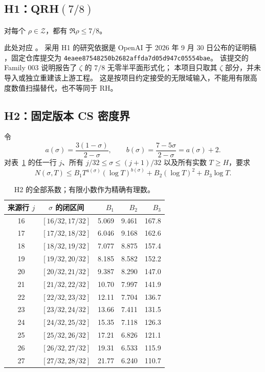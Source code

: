\subsection{H1：QRH$(7/8)$}

\begin{definition}[H1：八分之七零点界]
\label{hyp:qrh}
对每个 $\rho\in\mathcal Z$，都有 $\Re\rho\le7/8$。
\end{definition}
此处对应 。
采用 H1 的研究依据是 OpenAI 于 2026 年 9 月 30 日公布的证明稿
\cite{OpenAIQRH}，固定仓库提交为
\nolinkurl{4eaee87548250b2682affda7d05d947c05554bae}。
该提交的 Family 003 说明报告了 $\zeta$ 的 $7/8$ 无零半平面形式化；
本项目只取其 $\zeta$ 部分，并未导入或独立重建该上游工程。
这是按项目约定接受的无限域输入，不能用有限高度数值扫描替代，也不等同于 RH。

\subsection{H2：固定版本 CS 密度界}

\begin{definition}[H2：CS v2 的指定十二行]
\label{hyp:cs}
令
\[
a(\sigma)=\frac{3(1-\sigma)}{2-\sigma},\qquad
b(\sigma)=\frac{7-5\sigma}{2-\sigma}=a(\sigma)+2.
\]
对表~\ref{tab:cs-input} 的任一行 $j$、所有
$j/32\le\sigma\le(j+1)/32$ 以及所有实数 $T\ge H$，要求
\begin{equation}
\label{eq:cs-input}
N(\sigma,T)\le
B_1 T^{a(\sigma)}(\log T)^{b(\sigma)}
+B_2(\log T)^2+B_3\log T.
\end{equation}
\end{definition}

\begin{table}[htbp]
\centering\small
\caption{H2 的全部系数；有限小数作为精确有理数。}
\label{tab:cs-input}
\begin{tabular}{ccrrr}
\toprule
来源行 $j$ & $\sigma$ 的闭区间 & $B_1$ & $B_2$ & $B_3$ \\
\midrule
16 & $[16/32,17/32]$ & 5.069 & 9.461 & 167.8 \\
17 & $[17/32,18/32]$ & 6.046 & 9.168 & 162.6 \\
18 & $[18/32,19/32]$ & 7.077 & 8.875 & 157.4 \\
19 & $[19/32,20/32]$ & 8.185 & 8.582 & 152.2 \\
20 & $[20/32,21/32]$ & 9.387 & 8.290 & 147.0 \\
21 & $[21/32,22/32]$ & 10.70 & 7.997 & 141.9 \\
22 & $[22/32,23/32]$ & 12.11 & 7.704 & 136.7 \\
23 & $[23/32,24/32]$ & 13.66 & 7.411 & 131.5 \\
24 & $[24/32,25/32]$ & 15.35 & 7.118 & 126.3 \\
25 & $[25/32,26/32]$ & 17.21 & 6.826 & 121.1 \\
26 & $[26/32,27/32]$ & 19.31 & 6.533 & 115.9 \\
27 & $[27/32,28/32]$ & 21.77 & 6.240 & 110.7 \\
\bottomrule
\end{tabular}
\end{table}

